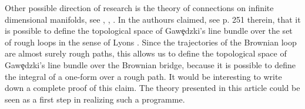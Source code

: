 \documentclass[11pt,a4paper,leqno]{amsart}%
\theoremstyle{plain}
\theoremstyle{remark}
\theoremstyle{plain}
\numberwithin{equation}{section}
\begin{document}
Other possible direction of research is the theory of connections
on infinite dimensional manifolds, see \cite{[Gawedzki-1988]},
\cite{[Brylinski-1992]}, \cite{[Leandre-1999]}. In
\cite{[Brz-Leandre-2000]} the authours claimed, see p. 251
therein, that it is possible to define the topological space of
Gaw{\c e}dzki's \cite{[Gawedzki-1988]} line bundle over the set of
rough loops in the sense of Lyons \cite{[Lyons-1998]}. Since the
trajectories of the Brownian loop are almost surely rough paths,
this allows us to define the topological space of Gaw{\c e}dzki's
line bundle over the Brownian bridge, because it is possible to
define the integral of a one-form over a rough path. It would be
interesting to write down a complete proof of this claim. The
theory presented in this article could be seen as a first step in
realizing such a programme.
\end{document}
